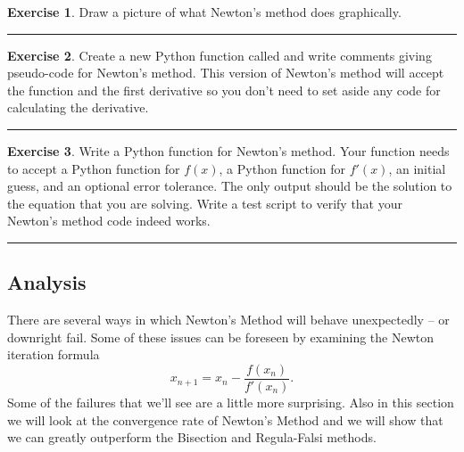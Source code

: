 \documentclass[
]{book}
\theoremstyle{definition}
\theoremstyle{definition}
\theoremstyle{definition}
\newtheorem{exercise}{Exercise}[chapter]
\theoremstyle{remark}
\begin{document}
\begin{exercise}
\protect\hypertarget{exr:unnamed-chunk-103}{}{\label{exr:unnamed-chunk-103} }Draw a picture of what Newton's method does graphically.
\end{exercise}

\begin{center}\rule{0.5\linewidth}{0.5pt}\end{center}

\begin{exercise}
\protect\hypertarget{exr:unnamed-chunk-104}{}{\label{exr:unnamed-chunk-104} }Create a new Python function called and write comments giving pseudo-code for
Newton's method. This version of Newton's method will accept the
function and the first derivative so you don't need to set aside any
code for calculating the derivative.
\end{exercise}

\begin{center}\rule{0.5\linewidth}{0.5pt}\end{center}

\begin{exercise}
\protect\hypertarget{exr:unnamed-chunk-105}{}{\label{exr:unnamed-chunk-105} }Write a Python function for Newton's method. Your function needs to accept a Python function for \(f(x)\), a Python function for \(f'(x)\), an initial guess,
and an optional error tolerance. The only output should be the solution
to the equation that you are solving. Write a test script to verify that
your Newton's method code indeed works.
\end{exercise}

\begin{center}\rule{0.5\linewidth}{0.5pt}\end{center}

\hypertarget{analysis-2}{%
\subsection{Analysis}\label{analysis-2}}

There are several ways in which Newton's Method will behave unexpectedly
-- or downright fail. Some of these issues can be foreseen by examining
the Newton iteration formula
\[ x_{n+1} = x_n - \frac{f(x_n)}{f'(x_n)}. \]
Some of the failures that we'll see are a little more surprising. Also in this section we will look at the convergence rate of Newton's Method and we will show that we can greatly outperform the Bisection and Regula-Falsi methods.
\end{document}

